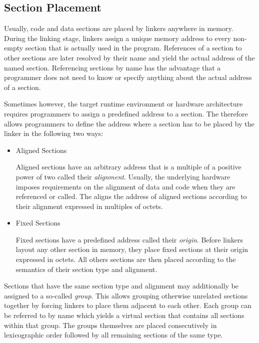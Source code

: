 \subsection{Section Placement}\label{sec:objsectionplacement}

Usually, code and data sections are placed by linkers anywhere in memory.
During the linking stage, linkers assign a unique memory address to every non-empty section that is actually used in the program.
References of a section to other sections are later resolved by their name and yield the actual address of the named section.
Referencing sections by name has the advantage that a programmer does not need to know or specify anything about the actual address of a section.

Sometimes however, the target runtime environment or hardware architecture requires programmers to assign a predefined address to a section.
The \ecs{} therefore allows programmers to define the address where a section has to be placed by the linker in the following two ways:

\begin{itemize}

\item Aligned Sections\alignright{}\nopagebreak

Aligned sections have an arbitrary address that is a multiple of a positive power of two called their \emph{alignment}.
Usually, the underlying hardware imposes requirements on the alignment of data and code when they are referenced or called.
The \ecs{} aligns the address of aligned sections according to their alignment expressed in multiples of octets.

\item Fixed Sections\alignright{}\nopagebreak

Fixed sections have a predefined address called their \emph{origin}.
Before linkers layout any other section in memory, they place fixed sections at their origin expressed in octets.
All others sections are then placed according to the semantics of their section type and alignment.

\end{itemize}

Sections that have the same section type and alignment may additionally be assigned to a so-called \emph{group}.
This allows grouping otherwise unrelated sections together by forcing linkers to place them adjacent to each other.
Each group can be referred to by name which yields a virtual section that contains all sections within that group.
The groups themselves are placed consecutively in lexicographic order followed by all remaining sections of the same type.

